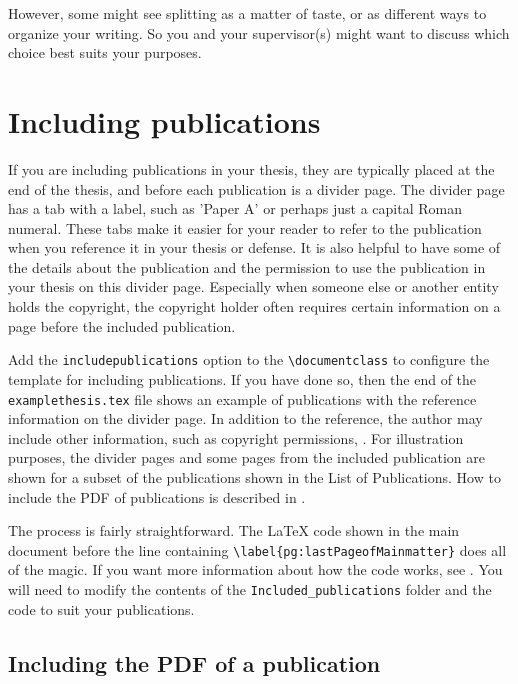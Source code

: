 \documentclass[12pt, twoside]{article}
\newcommand{\fname}[1]{\texttt{#1}}
\begin{document}
However, some might see splitting as a matter of taste, or as different ways to organize your writing. So you and your supervisor(s) might want to discuss which choice best suits your purposes.

\section{Including publications}
\label{sec:cycle3IncludingPublications}

If you are including publications in your thesis, they are typically placed at the end of the thesis, and before each publication is a divider page. The divider page has a tab with a label, such as 'Paper A' or perhaps just a capital Roman numeral. These tabs make it easier for your reader to refer to the publication when you reference it in your thesis or defense. It is also helpful to have some of the details about the publication and the permission to use the publication in your thesis on this divider page. Especially when someone else or another entity holds the copyright, the copyright holder often requires certain information on a page before the included publication.

Add the \texttt{includepublications} option to the \texttt{\textbackslash documentclass} to configure the template for including publications.
If you have done so, then the end of the \fname{examplethesis.tex} file shows an example of publications with the reference information on the divider page. In addition to the reference, the author may include other information, such as copyright permissions, \etc. For illustration purposes, the divider pages and some pages from the included publication are shown for a subset of the publications shown in the List of Publications. How to include the \gls{PDF} of publications is described in .

The process is fairly straightforward.
The \LaTeX{} code shown in the main document before the line containing \texttt{\textbackslash label\{pg:lastPageofMainmatter\}} does all of the magic. 
If you want more information about how the code works, see .
You will need to modify the contents of the \texttt{Included\_publications} folder and the code to suit your publications.

\subsection{Including the PDF of a publication}
\label{sec:IncludingPDFofPublication}
\end{document}
